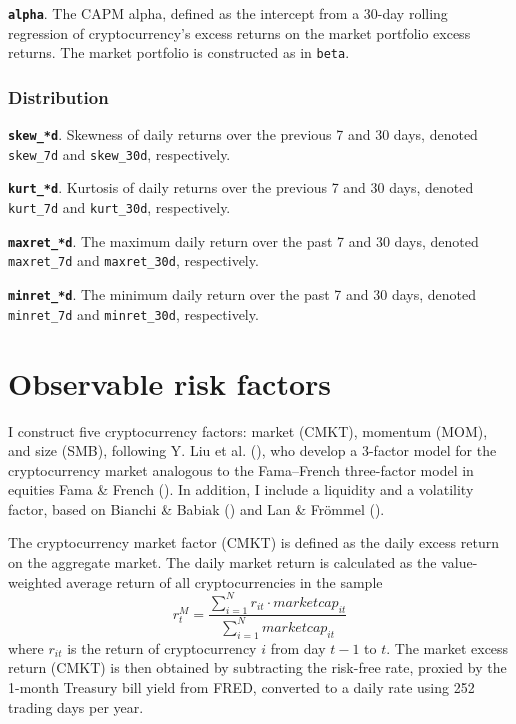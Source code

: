 \documentclass[
  12pt,
  a4paper,
  openany]{scrbook}
\begin{document}
\textbf{\texttt{alpha}}. The CAPM alpha, defined as the intercept from a
30-day rolling regression of cryptocurrency's excess returns on the
market portfolio excess returns. The market portfolio is constructed as
in \texttt{beta}.

\subsubsection{Distribution}\label{distribution}

\textbf{\texttt{skew\_*d}}. Skewness of daily returns over the previous
7 and 30 days, denoted \texttt{skew\_7d} and \texttt{skew\_30d},
respectively.

\textbf{\texttt{kurt\_*d}}. Kurtosis of daily returns over the previous
7 and 30 days, denoted \texttt{kurt\_7d} and \texttt{kurt\_30d},
respectively.

\textbf{\texttt{maxret\_*d}}. The maximum daily return over the past 7
and 30 days, denoted \texttt{maxret\_7d} and \texttt{maxret\_30d},
respectively.

\textbf{\texttt{minret\_*d}}. The minimum daily return over the past 7
and 30 days, denoted \texttt{minret\_7d} and \texttt{minret\_30d},
respectively.

\section{Observable risk factors}\label{sec-obs_factors}

I construct five cryptocurrency factors: market (CMKT), momentum (MOM),
and size (SMB), following Y. Liu et al.
(), who develop a 3-factor model
for the cryptocurrency market analogous to the Fama--French three-factor
model in equities Fama \& French
(). In addition, I include a
liquidity and a volatility factor, based on Bianchi \& Babiak
() and Lan \& Frömmel
().

The cryptocurrency market factor (CMKT) is defined as the daily excess
return on the aggregate market. The daily market return is calculated as
the value-weighted average return of all cryptocurrencies in the sample
\[
r_t^M = \frac{\sum_{i=1}^N r_{it} \cdot marketcap_{it}}
             {\sum_{i=1}^N marketcap_{it} }
\] where \(r_{it}\) is the return of cryptocurrency \(i\) from day
\(t-1\) to \(t\). The market excess return (CMKT) is then obtained by
subtracting the risk-free rate, proxied by the 1-month Treasury bill
yield from FRED, converted to a daily rate using 252 trading days per
year.
\end{document}
